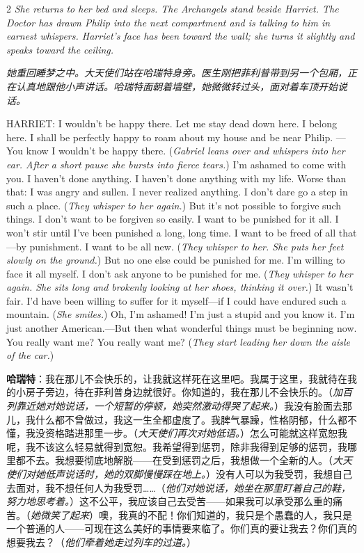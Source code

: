 \documentclass[lang=cn,newtx,10pt,scheme=chinese]{elegantbook}
\newcommand{\pair}[2]{%
\switchcolumn* #2\par
\switchcolumn  #1\par
}
\begin{document}
\begin{paracol}{2}
\pair{
    \textit{她重回睡梦之中。大天使们站在哈瑞特身旁。医生刚把菲利普带到另一个包厢，正在认真地跟他小声讲话。哈瑞特面朝着墙壁，她微微转过头，面对着车顶开始说话。}
}{
    \textit{She returns to her bed and sleeps. The Archangels stand beside Harriet. The Doctor has drawn Philip into the next compartment and is talking to him in earnest whispers. Harriet’s face has been toward the wall; she turns it slightly and speaks toward the ceiling.}
    \newline
}

\pair{
    \textbf{哈瑞特}：我在那儿不会快乐的，让我就这样死在这里吧。我属于这里，我就待在我的小房子旁边，待在菲利普身边就很好。你知道的，我在那儿不会快乐的。（\textit{加百列靠近她对她说话，一个短暂的停顿，她突然激动得哭了起来。}）我没有脸面去那儿，我什么都不曾做过，我这一生全都虚度了。我脾气暴躁，性格阴郁，什么都不懂，我没资格踏进那里一步。（\textit{大天使们再次对她低语。}）怎么可能就这样宽恕我呢，我不该这么轻易就得到宽恕。我希望得到惩罚，除非我得到足够的惩罚，我哪里都不去。我想要彻底地解脱——在受到惩罚之后，我想做一个全新的人。（\textit{大天使们对她低声说话时，她的双脚慢慢踩在地上。}）没有人可以为我受罚，我想自己去面对，我不想任何人为我受罚……（\textit{他们对她说话，她坐在那里盯着自己的鞋，努力地思考着。}）这不公平，我应该自己去受苦——如果我可以承受那么重的痛苦。（\textit{她微笑了起来}）噢，我真的不配！你们知道的，我只是个愚蠢的人，我只是一个普通的人——可现在这么美好的事情要来临了。你们真的要让我去？你们真的想要我去？（\textit{他们牵着她走过列车的过道。}）
}{
    HARRIET: I wouldn't be happy there. Let me stay dead down here. I belong here. I shall be perfectly happy to roam about my house and be near Philip. —You know I wouldn't be happy there. (\textit{Gabriel leans over and whispers into her ear. After a short pause she bursts into fierce tears.}) I'm ashamed to come with you. I haven't done anything. I haven't done anything with my life. Worse than that: I was angry and sullen. I never realized anything. I don't dare go a step in such a place. (\textit{They whisper to her again.}) But it's not possible to forgive such things. I don't want to be forgiven so easily. I want to be punished for it all. I won't stir until I've been punished a long, long time. I want to be freed of all that—by punishment. I want to be all new. (\textit{They whisper to her. She puts her feet slowly on the ground.}) But no one else could be punished for me. I'm willing to face it all myself. I don't ask anyone to be punished for me. (\textit{They whisper to her again. She sits long and brokenly looking at her shoes, thinking it over.}) It wasn't fair. I'd have been willing to suffer for it myself—if I could have endured such a mountain. (\textit{She smiles.}) Oh, I'm ashamed! I'm just a stupid and you know it. I'm just another American.—But then what wonderful things must be beginning now. You really want me? You really want me? (\textit{They start leading her down the aisle of the car.})
}


\end{paracol}
\end{document}

